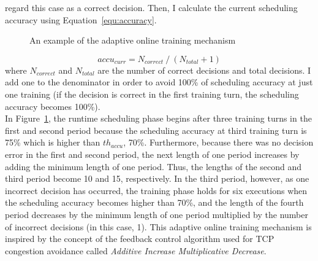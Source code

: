 {{regard this case as a correct decision.
%
Then, I calculate the current scheduling accuracy using
Equation~\eqref{equ:accuracy}.
%
\begin{figure}
\centering
{}
\caption{An example of the adaptive online training mechanism}
\label{fig:malmos_example}
\end{figure}
%
\begin{equation}
	accu_{curr} = N_{correct}\:/\:(N_{total} + 1)
\label{equ:accuracy}
\end{equation}
%
where $N_{correct}$ and $N_{total}$ are the number of correct decisions
and total decisions.
%
I add one to the denominator in order to avoid 100\% of
scheduling accuracy at just one training (if the decision is correct in
the first training turn, the scheduling accuracy becomes 100\%).\\
%
In Figure~\ref{fig:malmos_example}, the runtime scheduling phase begins after three
training turns in the first and second period because the scheduling
accuracy at third training turn is 75\% which is higher than 
$th_{accu}$, 70\%.
%
Furthermore, because there was no decision error in the first and second
period, the next length of one period increases by adding the
minimum length of one period.
%
Thus, the lengths of the second and third period become 10 and 15,
respectively.
%
In the third period, however, as one incorrect decision has
occurred, the training phase holds for six executions when the
scheduling accuracy becomes higher than 70\%, and the length of the
fourth period decreases by the minimum length of one period multiplied
by the number of incorrect decisions (in this case, 1).
%
This adaptive online training mechanism is inspired by the concept of
the feedback control algorithm used for TCP congestion avoidance called
\textit{Additive Increase Multiplicative Decrease}.
%

}}
